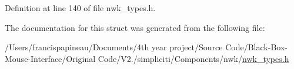 \-Definition at line 140 of file nwk\-\_\-types.\-h.



\-The documentation for this struct was generated from the following file\-:\begin{DoxyCompactItemize}
\item 
/\-Users/francispapineau/\-Documents/4th year project/\-Source Code/\-Black-\/\-Box-\/\-Mouse-\/\-Interface/\-Original Code/\-V2./simpliciti/\-Components/nwk/\hyperlink{nwk__types_8h}{nwk\-\_\-types.\-h}\end{DoxyCompactItemize}
